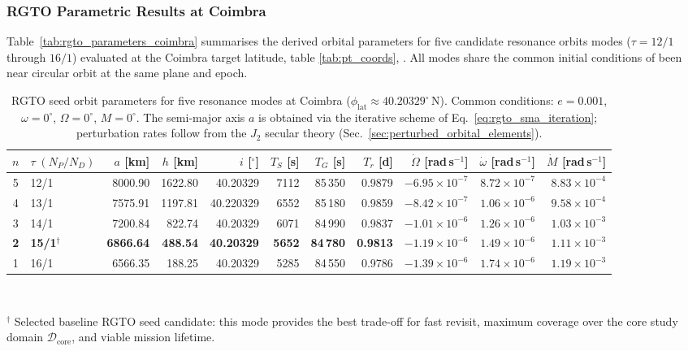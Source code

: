 \subsubsection{RGTO Parametric Results at Coimbra}
\label{sec:rgto_parametric_results}

Table~\ref{tab:rgto_parameters_coimbra} summarises the derived orbital parameters for five candidate resonance orbits modes ($\tau = 12/1$ through $16/1$) evaluated at the Coimbra target latitude, table \ref{tab:pt_coords}, .  All modes share the common initial conditions of been near circular orbit at the same plane and epoch.

\begin{table}[H]
\centering
\caption{\footnotesize{RGTO seed orbit parameters for five resonance modes at Coimbra ($\phi_{\text{lat}} \approx 40.20329^{\circ}$\,N).  Common conditions: $e = 0.001$, $\omega = 0^{\circ}$, $\Omega = 0^{\circ}$, $M = 0^{\circ}$.  The semi-major axis $a$ is obtained via the iterative scheme of Eq.~\eqref{eq:rgto_sma_iteration}; perturbation rates follow from the $J_2$ secular theory (Sec.~\ref{sec:perturbed_orbital_elements}).}}
\label{tab:rgto_parameters_coimbra}
\smallskip
\footnotesize
\setlength{\tabcolsep}{4pt}
\begin{tabular}{c l r r r r r r r r r}
\toprule
$n$
  & $\tau\;(N_P\!/N_D)$
  & $a$ [km]
  & $h$ [km]
  & $i$ [$^{\circ}$]
  & $T_S$ [s]
  & $T_G$ [s]
  & $T_r$ [d]
  & $\dot{\Omega}$ [rad\,s$^{-1}$]
  & $\dot{\omega}$ [rad\,s$^{-1}$]
  & $\dot{M}$ [rad\,s$^{-1}$] \\
\midrule
5 & 12/1 & 8000.90  & 1622.80 & 40.20329  & 7112  & 85\,350 & 0.9879  & $-6.95{\times}10^{-7}$ & $8.72{\times}10^{-7}$ & $8.83{\times}10^{-4}$ \\
4 & 13/1 & 7575.91  & 1197.81 & 40.220329  & 6552  & 85\,180 & 0.9859  & $-8.42{\times}10^{-7}$ & $1.06{\times}10^{-6}$ & $9.58{\times}10^{-4}$ \\
3 & 14/1 & 7200.84  & 822.74  & 40.20329  & 6071  & 84\,990 & 0.9837  & $-1.01{\times}10^{-6}$ & $1.26{\times}10^{-6}$ & $1.03{\times}10^{-3}$ \\
\rowcolor{green!15} {\bfseries 2} & {\bfseries 15/1$^{\dagger}$} & {\bfseries 6866.64}  & {\bfseries 488.54}  & {\bfseries 40.20329}  & {\bfseries 5652}  & {\bfseries 84\,780} & {\bfseries 0.9813}  & {\bfseries $-1.19{\times}10^{-6}$} & {\bfseries $1.49{\times}10^{-6}$} & {\bfseries $1.11{\times}10^{-3}$} \\
1 & 16/1 & 6566.35  & 188.25  & 40.20329  & 5285  & 84\,550 & 0.9786  & $-1.39{\times}10^{-6}$ & $1.74{\times}10^{-6}$ & $1.19{\times}10^{-3}$ \\
\bottomrule
\end{tabular}
\\[2pt]
{\footnotesize \parbox{0.97\linewidth}{$^{\dagger}$ Selected baseline RGTO seed candidate: this mode provides the best trade-off for fast revisit, maximum coverage over the core study domain $\mathcal{D}_{\mathrm{core}}$, and viable mission lifetime.}}
\label{tab:rgto_family_coimbra}
\end{table}


